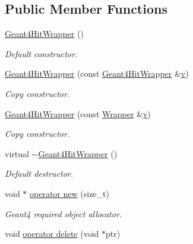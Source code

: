 \subsection*{Public Member Functions}
\begin{DoxyCompactItemize}
\item 
\hyperlink{class_d_d4hep_1_1_simulation_1_1_geant4_hit_wrapper_a57ccfb5f6f606751279a9c3222532250}{Geant4\+Hit\+Wrapper} ()
\begin{DoxyCompactList}\small\item\em Default constructor. \end{DoxyCompactList}\item 
\hyperlink{class_d_d4hep_1_1_simulation_1_1_geant4_hit_wrapper_a067b6f5a7e88d4f85d6554b563047916}{Geant4\+Hit\+Wrapper} (const \hyperlink{class_d_d4hep_1_1_simulation_1_1_geant4_hit_wrapper}{Geant4\+Hit\+Wrapper} \&\hyperlink{_multi_view_8cpp_a8320ee13ac034dbf6d624fe8953dd337}{v})
\begin{DoxyCompactList}\small\item\em Copy constructor. \end{DoxyCompactList}\item 
\hyperlink{class_d_d4hep_1_1_simulation_1_1_geant4_hit_wrapper_a4582891698f74e839dadd7cb78ae00e4}{Geant4\+Hit\+Wrapper} (const \hyperlink{class_d_d4hep_1_1_simulation_1_1_geant4_hit_wrapper_a4779e35eba7d553e0f2d497c49a42ec6}{Wrapper} \&\hyperlink{_multi_view_8cpp_a8320ee13ac034dbf6d624fe8953dd337}{v})
\begin{DoxyCompactList}\small\item\em Copy constructor. \end{DoxyCompactList}\item 
virtual \hyperlink{class_d_d4hep_1_1_simulation_1_1_geant4_hit_wrapper_ae5a3a00858bb69ec71673f7286be2bab}{$\sim$\+Geant4\+Hit\+Wrapper} ()
\begin{DoxyCompactList}\small\item\em Default destructor. \end{DoxyCompactList}\item 
void $\ast$ \hyperlink{class_d_d4hep_1_1_simulation_1_1_geant4_hit_wrapper_a645e452e2bb8c642286e323e514f0fef}{operator new} (size\+\_\+t)
\begin{DoxyCompactList}\small\item\em Geant4 required object allocator. \end{DoxyCompactList}\item 
void \hyperlink{class_d_d4hep_1_1_simulation_1_1_geant4_hit_wrapper_a3ca9f5bf49528ab59adaa68d2708f8c3}{operator delete} (void $\ast$ptr)

\end{DoxyCompactItemize}
